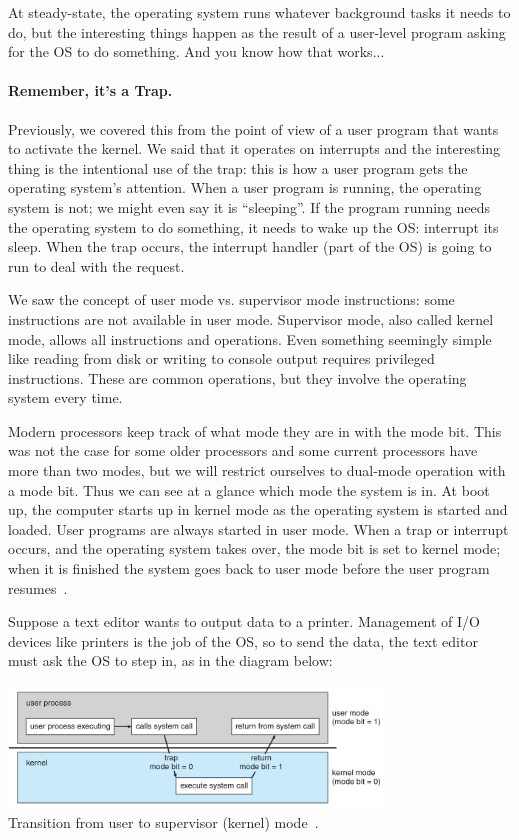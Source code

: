 At steady-state, the operating system runs whatever background tasks it needs to do, but the interesting things happen as the result of a user-level program asking for the OS to do something. And you know how that works...

\paragraph{Remember, it's a Trap.}

Previously, we covered this from the point of view of a user program that wants to activate the kernel. We said that it operates on interrupts and the interesting thing is the intentional use of the trap: this is how a user program gets the operating system's attention. When a user program is running, the operating system is not; we might even say it is ``sleeping''. If the program running needs the operating system to do something, it needs to wake up the OS: interrupt its sleep. When the trap occurs, the interrupt handler (part of the OS) is going to run to deal with the request.

We saw the concept of user mode vs. supervisor mode instructions: some instructions are not available in user mode. Supervisor mode, also called kernel mode, allows all instructions and operations. Even something seemingly simple like reading from disk or writing to console output requires privileged instructions. These are common operations, but they involve the operating system every time.

Modern processors keep track of what mode they are in with the mode bit. This was not the case for some older processors and some current processors have more than two modes, but we will restrict ourselves to dual-mode operation with a mode bit. Thus we can see at a glance which mode the system is in. At boot up, the computer starts up in kernel mode as the operating system is started and loaded. User programs are always started in user mode. When a trap or interrupt occurs, and the operating system takes over, the mode bit is set to kernel mode; when it is finished the system goes back to user mode before the user program resumes~\cite{osc}.

Suppose a text editor wants to output data to a printer. Management of I/O devices like printers is the job of the OS, so to send the data, the text editor must ask the OS to step in, as in the diagram below:

\begin{center}
	\includegraphics[width=0.75\textwidth]{images/trap.png}\\
	Transition from user to supervisor (kernel) mode~\cite{osc}.
\end{center}

